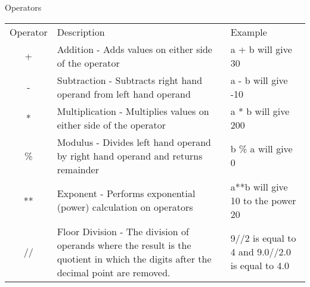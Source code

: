 \documentclass[presentation]{beamer}
\begin{document}
\begin{frame}[label=sec-10-1-1]{Operators}
\tiny
\begin{center}
\begin{tabular}{|c|p{2in}|l|}
Operator & Description & Example\\
+ & Addition - Adds values on either side of the operator & a + b will give 30\\
- & Subtraction - Subtracts right hand operand from left hand operand & a - b will give -10\\
* & Multiplication - Multiplies values on either side of the operator & a * b will give 200\\
\% & Modulus - Divides left hand operand by right hand operand and returns remainder & b \% a will give 0\\
** & Exponent - Performs exponential (power) calculation on operators & a**b will give 10 to the power 20\\
// & Floor Division - The division of operands where the result is the quotient in which the digits after the decimal point are removed. & 9//2 is equal to 4 and 9.0//2.0 is equal to 4.0\\
\end{tabular}
\end{center}
\end{frame}
\end{document}
